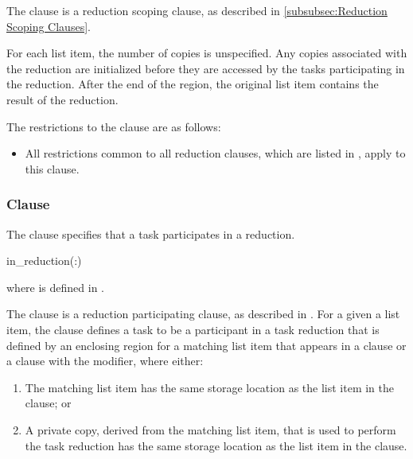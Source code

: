\descr
The  clause is a reduction scoping clause, as described in
\ref{subsubsec:Reduction Scoping Clauses}.

For each list item, the number of copies is unspecified. Any copies associated
with the reduction are initialized before they are accessed by the tasks
participating in the reduction. After the end of the region, the original list
item contains the result of the reduction.

\restrictions
The restrictions to the  clause are as follows:

\begin{itemize}
\item All restrictions common to all reduction clauses, which are listed in
      , apply to
      this clause.
\end{itemize}



\subsubsection{ Clause}
\label{subsubsec:in_reduction clause}
\summary
The  clause specifies that a task participates in a reduction.

\syntax
\begin{ompSyntax}
in_reduction(:)
\end{ompSyntax}

where  is defined in 
.

\descr
The  clause is a reduction participating clause, as
described in . For a
given a list item, the  clause defines a task to be a
participant in a task reduction that is defined by an enclosing region for a
matching list item that appears in a  clause or a
 clause with the  modifier, where either:

\begin{enumerate}
\item The matching list item has the same storage location as the list
      item in the  clause; or
\item A private copy, derived from the matching list item, that is used to
      perform the task reduction has the same storage location as the list item
      in the  clause.
\end{enumerate}

